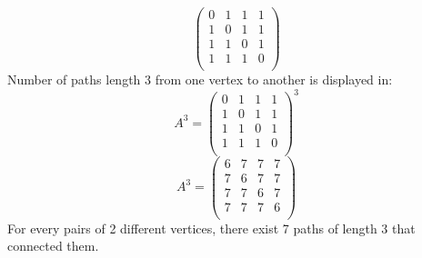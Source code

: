 \documentclass[a4paper]{article}
\begin{document}
\begin{enumerate}[label = \alph*)]
\begin{equation*}
\begin{pmatrix}
    	0 & 1 & 1 & 1\\
    	1 & 0 & 1 & 1\\
    	1 & 1 & 0 & 1\\
    	1 & 1 & 1 & 0\\
    	\end{pmatrix}
    	\end{equation*}
    	Number of paths length 3 from one vertex to another is displayed in:
    	\begin{equation*}
    	A^3=
    	\begin{pmatrix}
    	0 & 1 & 1 & 1\\
    	1 & 0 & 1 & 1\\
    	1 & 1 & 0 & 1\\
    	1 & 1 & 1 & 0\\
    	\end{pmatrix}^3
    	\end{equation*}
    	\begin{equation*}
    	A^3=
    	\begin{pmatrix}
    	6 & 7 & 7 & 7\\
    	7 & 6 & 7 & 7\\
    	7 & 7 & 6 & 7\\
    	7 & 7 & 7 & 6\\
    	\end{pmatrix}
    	\end{equation*}
    	For every pairs of 2 different vertices, there exist 7 paths of length 3 that connected them.
	\end{enumerate}

    
\end{document}
